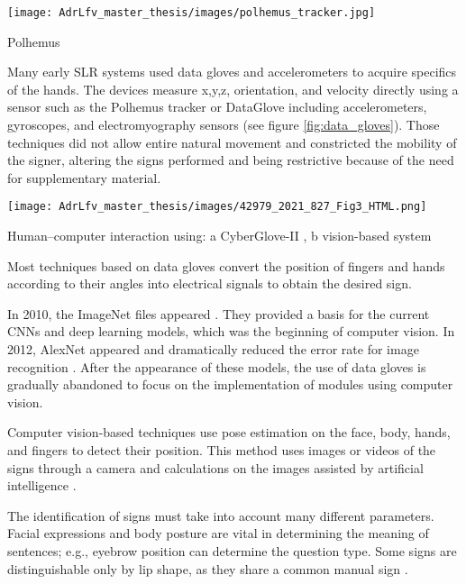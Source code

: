 \begin{marginfigure}
    \centering
    \texttt{[image: AdrLfv\_master\_thesis/images/polhemus\_tracker.jpg]}
    \caption{Polhemus}
    \label{fig:Polhemus}
\end{marginfigure}

Many early SLR systems used data gloves and accelerometers to acquire specifics of the hands. The devices measure x,y,z, orientation, and velocity directly using a sensor such as the Polhemus tracker \cite{413199} \cite{5738842} or DataGlove \cite{Kadous1970} \cite{Metaxas1970} including accelerometers, gyroscopes, and electromyography sensors  (see figure \ref{fig:data_gloves}). Those techniques did not allow entire natural movement and constricted the mobility of the signer, altering the signs performed and being restrictive because of the need for supplementary material.

\begin{marginfigure}
    \centering
    \texttt{[image: AdrLfv\_master\_thesis/images/42979\_2021\_827\_Fig3\_HTML.png]}
    \caption{Human–computer interaction using: a CyberGlove-II \cite{cyberglovesystems}, b vision-based system}
    \label{fig:data_gloves}
\end{marginfigure}

Most techniques based on data gloves convert the position of fingers and hands according to their angles into electrical signals to obtain the desired sign. 

In 2010, the ImageNet files appeared \cite{li2010crowdsourcing}. They provided a basis for the current CNNs and deep learning models, which was the beginning of computer vision. In 2012, AlexNet appeared and dramatically reduced the error rate for image recognition \cite{alom2018history}. After the appearance of these models, the use of data gloves is gradually abandoned to focus on the implementation of modules using computer vision.

Computer vision-based techniques use pose estimation on the face, body, hands, and fingers to detect their position. This method uses images or videos of the signs through a camera and calculations on the images assisted by artificial intelligence \cite{adeyanju2021machine}. 

The identification of signs must take into account many different parameters. Facial expressions and body posture are vital in determining the meaning of sentences; e.g., eyebrow position can determine the question type. Some signs are distinguishable only by lip shape, as they share a common manual sign \cite{cooper2011sign}. 


